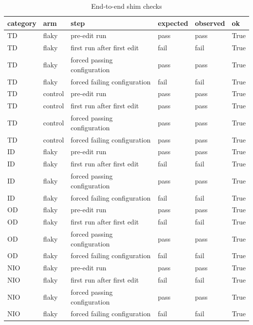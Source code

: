 \begin{table}[t]
\centering\small
\caption{End-to-end shim checks}
\label{tab:shim_e2e}
\begin{tabular}{llllll}
\toprule
\textbf{category} & \textbf{arm} & \textbf{step} & \textbf{expected} & \textbf{observed} & \textbf{ok} \\
\midrule
TD & flaky & pre-edit run & pass & pass & True \\
TD & flaky & first run after first edit & fail & fail & True \\
TD & flaky & forced passing configuration & pass & pass & True \\
TD & flaky & forced failing configuration & fail & fail & True \\
TD & control & pre-edit run & pass & pass & True \\
TD & control & first run after first edit & pass & pass & True \\
TD & control & forced passing configuration & pass & pass & True \\
TD & control & forced failing configuration & pass & pass & True \\
ID & flaky & pre-edit run & pass & pass & True \\
ID & flaky & first run after first edit & fail & fail & True \\
ID & flaky & forced passing configuration & pass & pass & True \\
ID & flaky & forced failing configuration & fail & fail & True \\
OD & flaky & pre-edit run & pass & pass & True \\
OD & flaky & first run after first edit & fail & fail & True \\
OD & flaky & forced passing configuration & pass & pass & True \\
OD & flaky & forced failing configuration & fail & fail & True \\
NIO & flaky & pre-edit run & pass & pass & True \\
NIO & flaky & first run after first edit & fail & fail & True \\
NIO & flaky & forced passing configuration & pass & pass & True \\
NIO & flaky & forced failing configuration & fail & fail & True \\
\bottomrule
\end{tabular}
\end{table}
